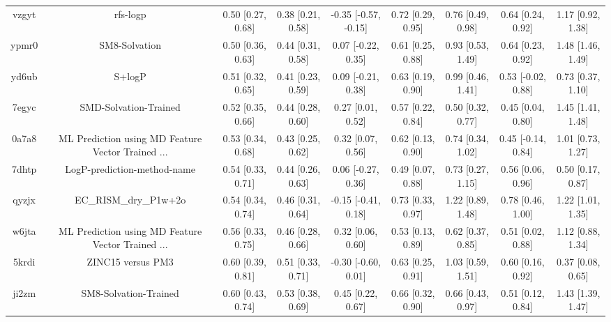 \documentclass{article}
\begin{document}
\begin{center}
\begin{longtable}{|ccccccccc|}
 vzgyt &                                           rfs-logp &  0.50 [0.27, 0.68] &  0.38 [0.21, 0.58] &  -0.35 [-0.57, -0.15] &  0.72 [0.29, 0.95] &    0.76 [0.49, 0.98] &    0.64 [0.24, 0.92] &     1.17 [0.92, 1.38] \\
 ypmr0 &                                      SM8-Solvation &  0.50 [0.36, 0.63] &  0.44 [0.31, 0.58] &    0.07 [-0.22, 0.35] &  0.61 [0.25, 0.88] &    0.93 [0.53, 1.49] &    0.64 [0.23, 0.92] &     1.48 [1.46, 1.49] \\
 yd6ub &                                             S+logP &  0.51 [0.32, 0.65] &  0.41 [0.23, 0.59] &    0.09 [-0.21, 0.38] &  0.63 [0.19, 0.90] &    0.99 [0.46, 1.41] &   0.53 [-0.02, 0.88] &     0.73 [0.37, 1.10] \\
 7egyc &                              SMD-Solvation-Trained &  0.52 [0.35, 0.66] &  0.44 [0.28, 0.60] &     0.27 [0.01, 0.52] &  0.57 [0.22, 0.84] &    0.50 [0.32, 0.77] &    0.45 [0.04, 0.80] &     1.45 [1.41, 1.48] \\
 0a7a8 &  ML Prediction using MD Feature Vector Trained ... &  0.53 [0.34, 0.68] &  0.43 [0.25, 0.62] &     0.32 [0.07, 0.56] &  0.62 [0.13, 0.90] &    0.74 [0.34, 1.02] &   0.45 [-0.14, 0.84] &     1.01 [0.73, 1.27] \\
 7dhtp &                        LogP-prediction-method-name &  0.54 [0.33, 0.71] &  0.44 [0.26, 0.63] &    0.06 [-0.27, 0.36] &  0.49 [0.07, 0.88] &    0.73 [0.27, 1.15] &    0.56 [0.06, 0.96] &     0.50 [0.17, 0.87] \\
 qyzjx &                              EC\_RISM\_dry\_P1w+2o &  0.54 [0.34, 0.74] &  0.46 [0.31, 0.64] &   -0.15 [-0.41, 0.18] &  0.73 [0.33, 0.97] &    1.22 [0.89, 1.48] &    0.78 [0.46, 1.00] &     1.22 [1.01, 1.35] \\
 w6jta &  ML Prediction using MD Feature Vector Trained ... &  0.56 [0.33, 0.75] &  0.46 [0.28, 0.66] &     0.32 [0.06, 0.60] &  0.53 [0.13, 0.89] &    0.62 [0.37, 0.85] &    0.51 [0.02, 0.88] &     1.12 [0.88, 1.34] \\
 5krdi &                                  ZINC15 versus PM3 &  0.60 [0.39, 0.81] &  0.51 [0.33, 0.71] &   -0.30 [-0.60, 0.01] &  0.63 [0.25, 0.91] &    1.03 [0.59, 1.51] &    0.60 [0.16, 0.92] &     0.37 [0.08, 0.65] \\
 ji2zm &                              SM8-Solvation-Trained &  0.60 [0.43, 0.74] &  0.53 [0.38, 0.69] &     0.45 [0.22, 0.67] &  0.66 [0.32, 0.90] &    0.66 [0.43, 0.97] &    0.51 [0.12, 0.84] &     1.43 [1.39, 1.47] \\

\end{longtable}
\end{center}
\end{document}
